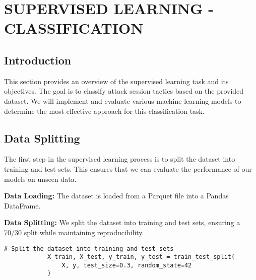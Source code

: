 

\section{SUPERVISED LEARNING - CLASSIFICATION}


    \subsection{Introduction}
    
        This section provides an overview of the supervised learning task and its objectives. The goal is to classify attack session tactics based on the provided dataset. We will implement and evaluate various machine learning models to determine the most effective approach for this classification task.

    \subsection{Data Splitting}
    
        The first step in the supervised learning process is to split the dataset into training and test sets. This ensures that we can evaluate the performance of our models on unseen data.

        \textbf{Data Loading:} The dataset is loaded from a Parquet file into a Pandas DataFrame.

        \textbf{Data Splitting:} We split the dataset into training and test sets, ensuring a 70/30 split while maintaining reproducibility.
        
        \vspace{0.5em}

        \begin{lstlisting}[caption={Split the dataset into training and test sets}, label={lst:split_dataset}]
            # Split the dataset into training and test sets
            X_train, X_test, y_train, y_test = train_test_split(
                X, y, test_size=0.3, random_state=42
            )
        \end{lstlisting}

